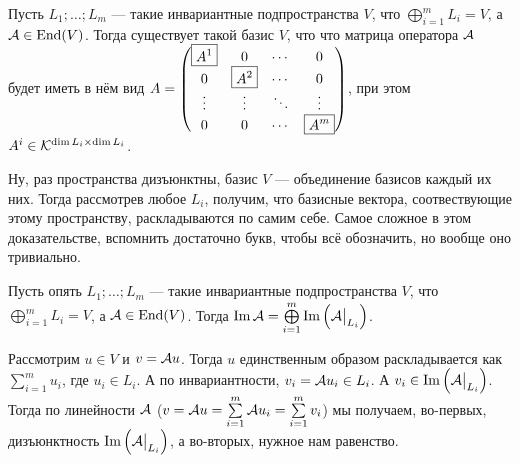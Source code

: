 \documentclass{article}
\DeclareMathOperator{\operIm}{Im}
\let\Im\operIm
\begin{document}
\begin{itemize}
\begin{Proof}
        \end{Proof}
        \thm Пусть $L_1;\ldots;L_m$ --- такие инвариантные подпространства $V$, что $\bigoplus\limits_{i=1}^m L_i=V$, а ${\mathcal{A}}\in\operatorname{End}(V)$. Тогда существует такой базис $V$, что что матрица оператора ${\mathcal{A}}$ будет иметь в нём вид $A=\left(\begin{matrix}\boxed{A^1} & 0 & \cdots & 0\\0 & \boxed{A^2} & \cdots & 0\\\vdots & \vdots & \ddots & \vdots\\0 & 0 & \cdots & \boxed{A^m}\end{matrix}\right)$, при этом $A^i\in{\mathcal{K}}^{\dim L_i\times\dim L_i}$.
        \begin{Proof}
            Ну, раз пространства дизъюнктны, базис $V$ --- объединение базисов каждый их них. Тогда рассмотрев любое $L_i$, получим, что базисные вектора, соотвествующие этому пространству, раскладываются по самим себе. Самое сложное в этом доказательстве, вспомнить достаточно букв, чтобы всё обозначить, но вообще оно тривиально.
        \end{Proof}
        \thm Пусть опять $L_1;\ldots;L_m$ --- такие инвариантные подпространства $V$, что $\bigoplus\limits_{i=1}^m L_i=V$, а ${\mathcal{A}}\in\operatorname{End}(V)$. Тогда $\Im\scriptA=\bigoplus\limits_{i=1}^m\Im\left(\scriptA\big|_{L_i}\right)$.
        \begin{Proof}
            Рассмотрим $u\in V$ и $v={\mathcal{A}} u$. Тогда $u$ единственным образом раскладывается как $\sum\limits_{i=1}^mu_i$, где $u_i\in L_i$. А по инвариантности, $v_i={\mathcal{A}} u_i\in L_i$. А $v_i\in\Im\left(\scriptA\big|_{L_i}\right)$. Тогда по линейности ${\mathcal{A}}$ ($v={\mathcal{A}} u=\sum\limits_{i=1}^m{\mathcal{A}} u_i=\sum\limits_{i=1}^mv_i$) мы получаем, во-первых, дизъюнктность $\Im\left(\scriptA\big|_{L_i}\right)$, а во-вторых, нужное нам равенство.
        \end{Proof}
    \end{itemize}
\end{document}
